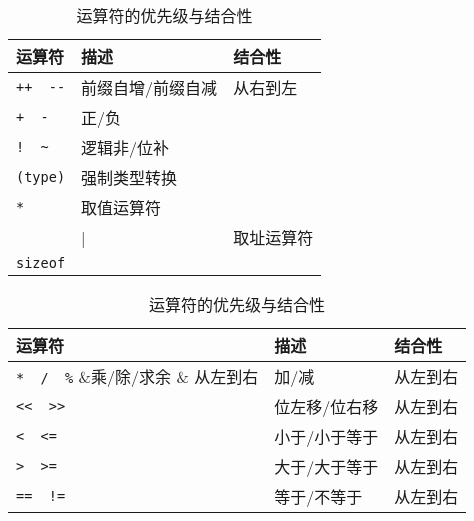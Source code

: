 \begin{frame}[fragile]\ft{\secname}  

\begin{table}[htbp]
  \centering 
  \caption{运算符的优先级与结合性}
  \begin{tabular}{l|l|l}\hline\hline
    运算符 & 描述 & 结合性 \\\hline    
    \lstinline|++  --| & 前缀自增/前缀自减& 从右到左 \\ 
    \lstinline|+  -| & 正/负 &\\
    \lstinline|!  ~| & 逻辑非/位补 &\\
    \lstinline|(type)| & 强制类型转换 &\\
    \lstinline|*| & 取值运算符&\\
    \lstinline|&| & 取址运算符 & \\
    \lstinline|sizeof| & &\\\hline
 \end{tabular}
\end{table}    
\end{frame}

\begin{frame}[fragile]\ft{\secname}  

\begin{table}[htbp]
  \centering 
  \caption{运算符的优先级与结合性}
  \begin{tabular}{l|l|l}\hline\hline
    运算符 & 描述 & 结合性 \\\hline    
    \lstinline|*  /  %| &乘/除/求余 & 从左到右\\\hline
    \lstinline|+  -| & 加/减 & 从左到右\\\hline
    \lstinline|<<  >>| & 位左移/位右移 & 从左到右\\\hline
    \lstinline|<  <=| & 小于/小于等于& 从左到右\\
    \lstinline|>  >=| & 大于/大于等于& 从左到右\\\hline
    \lstinline|==  !=| & 等于/不等于& 从左到右\\\hline
 \end{tabular}
\end{table}    
\end{frame}

